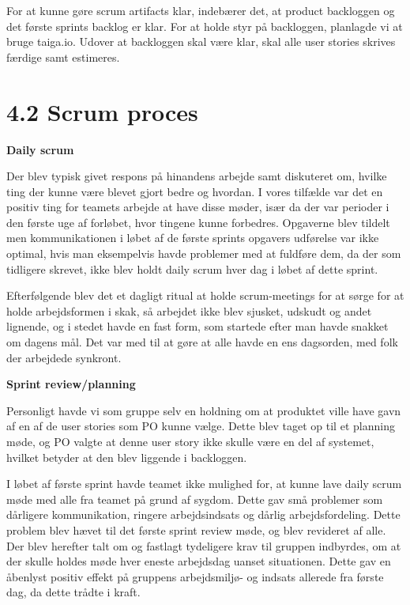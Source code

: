\documentclass[11pt]{report}
\begin{document}
For at kunne gøre scrum artifacts klar, indebærer det, at product backloggen og det første sprints backlog er klar. For at holde styr på backloggen, planlagde vi at bruge taiga.io. Udover at  backloggen skal være klar, skal alle user stories skrives færdige samt estimeres.

\newpage
\section*{4.2 Scrum proces}
\noindent\textbf{Daily scrum}
\par Der blev typisk givet respons på hinandens arbejde samt diskuteret om, hvilke ting der kunne være blevet gjort bedre og hvordan. I vores tilfælde var det en positiv ting for teamets arbejde at have disse møder, især da der var perioder i den første uge af forløbet, hvor tingene kunne forbedres. Opgaverne blev tildelt men kommunikationen i løbet af de første sprints opgavers udførelse var ikke optimal, hvis man eksempelvis havde problemer med at fuldføre dem, da der som tidligere skrevet, ikke blev holdt daily scrum hver dag i løbet af dette sprint.

Efterfølgende blev det et dagligt ritual at holde scrum-meetings for at sørge for at holde arbejdsformen i skak, så arbejdet ikke blev sjusket, udskudt og andet lignende, og i stedet havde en fast form, som startede efter man havde snakket om dagens mål. Det var med til at gøre at alle havde en ens dagsorden, med folk der arbejdede synkront.

\noindent\textbf{Sprint review/planning}
\par Personligt havde vi som gruppe selv en holdning om at produktet ville have gavn af en af de user stories som PO kunne vælge. Dette blev taget op til et planning møde, og PO valgte at denne user story ikke skulle være en del af systemet, hvilket betyder at den blev liggende i backloggen.

I løbet af første sprint havde teamet ikke mulighed for, at kunne lave daily scrum møde med alle fra teamet på grund af sygdom. Dette gav små problemer som dårligere kommunikation, ringere arbejdsindsats og dårlig arbejdsfordeling. Dette problem blev hævet til det første sprint review møde, og blev revideret af alle. Der blev herefter talt om og fastlagt tydeligere  krav til gruppen indbyrdes, om at der skulle holdes møde hver eneste arbejdsdag uanset situationen. Dette gav en åbenlyst positiv effekt på gruppens arbejdsmiljø- og indsats allerede fra første dag, da dette trådte i kraft.
\end{document}
